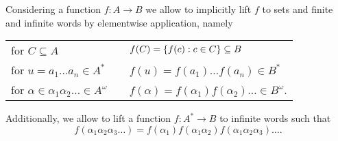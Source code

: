 Considering a function $f:A\rightarrow B$ we allow to implicitly lift $f$ to
sets and finite and infinite words by elementwise application, namely
\begin{center}
  \begin{tabular}{lp{0.5cm}l}
    for $C\subseteq A$ & & $f(C) = \left\{f(c) : c\in C\right\}\subseteq B$ \\
    for $u = a_{1}\dots a_{n}\in A^{*}$ & & $f(u) = f(a_{1})
    \dots f(a_{n}) \in B^{*}$ \\
  for $\alpha\in\alpha_{1}\alpha_{2}\dots\in A^{\omega}$
    & & $f(\alpha) = f(\alpha_{1})f(\alpha_{2})\dots\in B^{\omega}$.\\
  \end{tabular}
\end{center}
Additionally, we allow to lift a function $f:A^{*}\rightarrow B$ to infinite
words such that
\begin{equation*}
  f(\alpha_{1}\alpha_{2}\alpha_{3}\dots) = f(\alpha_{1})f(
    \alpha_{1}\alpha_{2})f(\alpha_{1}\alpha_{2}\alpha_{3})\dots.
\end{equation*}
